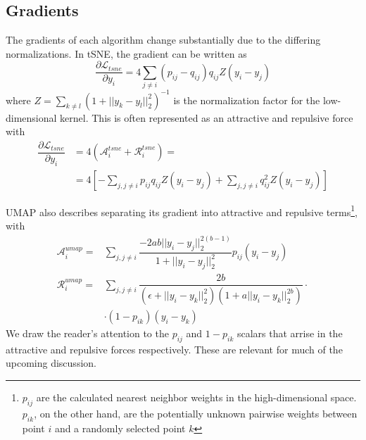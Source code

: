 \documentclass[sigconf, nonacm]{acmart}
\begin{document}
\subsection{Gradients}

The gradients of each algorithm change substantially due to the differing normalizations. In tSNE, the gradient can be written as
\begin{equation}
    \dfrac{\partial \mathcal{L}_{tsne}}{\partial y_i} = 4 \sum_{j \neq i} (p_{ij} - q_{ij}) q_{ij} Z (y_i - y_j)
\end{equation}
where $Z = \sum_{k \neq l} (1 + ||y_k - y_l||_2^2)^{-1}$ is the normalization factor for the low-dimensional kernel. This is often represented as an attractive
and repulsive force with
\begin{align*}
    \dfrac{\partial \mathcal{L}_{tsne}}{\partial y_i} &= 4(\mathcal{A}_i^{tsne} + \mathcal{R}_i^{tsne}) = \\
    &= 4 \left[ - \sum_{j, j \neq i} p_{ij}q_{ij}Z (y_i - y_j) + \sum_{j, j \neq i} q_{ij}^2 Z (y_i - y_j) \right]
\end{align*}

UMAP also describes separating its gradient into attractive and repulsive terms\footnote{$p_{ij}$ are the calculated nearest neighbor weights in the
high-dimensional space. $p_{ik}$, on the other hand, are the potentially unknown pairwise weights between point $i$ and a randomly selected point $k$}, with
\begin{align}
    \mathcal{A}_i^{umap} = & \sum_{j, j \neq i} \dfrac{-2ab||y_i - y_j||_2^{2(b-1)}}{1 + ||y_i - y_j||_2^2} p_{ij} (y_i - y_j) \label{umap_attr} \\
    \mathcal{R}_i^{umap} = & \sum_{j, j \neq i} \dfrac{2b}{(\epsilon + ||y_i - y_k||_2^2)(1 + a ||y_i - y_k||_2^{2b})} \cdot \label{umap_rep} \\
    &\cdot (1 - p_{ik}) (y_i - y_k) \nonumber
\end{align}
We draw the reader's attention to the $p_{ij}$ and $1 - p_{ik}$ scalars that arrise in the attractive and repulsive forces respectively. These are relevant for
much of the upcoming discussion.
\end{document}
